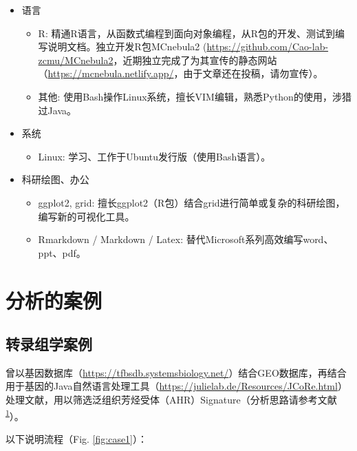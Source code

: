 \documentclass[
]{article}
\providecommand{\tightlist}{%
  \setlength{\itemsep}{0pt}\setlength{\parskip}{0pt}}
\begin{document}
\begin{itemize}
\tightlist
\item
  语言

  \begin{itemize}
  \tightlist
  \item
    R: 精通R语言，从函数式编程到面向对象编程，从R包的开发、测试到编写说明文档。独立开发R包MCnebula2 (\url{https://github.com/Cao-lab-zcmu/MCnebula2}，近期独立完成了为其宣传的静态网站（\url{https://mcnebula.netlify.app/}，由于文章还在投稿，请勿宣传）。
  \item
    其他: 使用Bash操作Linux系统，擅长VIM编辑，熟悉Python的使用，涉猎过Java。
  \end{itemize}
\item
  系统

  \begin{itemize}
  \tightlist
  \item
    Linux: 学习、工作于Ubuntu发行版（使用Bash语言）。
  \end{itemize}
\item
  科研绘图、办公

  \begin{itemize}
  \tightlist
  \item
    ggplot2, grid: 擅长ggplot2（R包）结合grid进行简单或复杂的科研绘图，编写新的可视化工具。
  \item
    Rmarkdown / Markdown / Latex: 替代Microsoft系列高效编写word、ppt、pdf。
  \end{itemize}
\end{itemize}

\hypertarget{ux5206ux6790ux7684ux6848ux4f8b}{%
\section{分析的案例}\label{ux5206ux6790ux7684ux6848ux4f8b}}

\hypertarget{ux8f6cux5f55ux7ec4ux5b66ux6848ux4f8b}{%
\subsection{转录组学案例}\label{ux8f6cux5f55ux7ec4ux5b66ux6848ux4f8b}}

曾以基因数据库（\url{https://tfbsdb.systemsbiology.net/}）结合GEO数据库，再结合用于基因的Java自然语言处理工具（\url{https://julielab.de/Resources/JCoRe.html}）处理文献，用以筛选泛组织芳烃受体（AHR）Signature（分析思路请参考文献\textsuperscript{\protect\hyperlink{ref-sadik_il4i1_2020}{1}}）。

以下说明流程（Fig. \ref{fig:case1}）：
\end{document}
